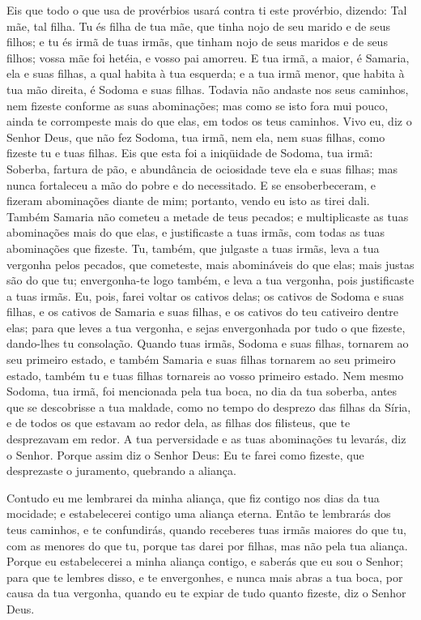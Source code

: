 Eis que todo o que usa de provérbios usará contra ti este
provérbio, dizendo: Tal mãe, tal filha. Tu és filha de tua
mãe, que tinha nojo de seu marido e de seus filhos; e tu és irmã de
tuas irmãs, que tinham nojo de seus maridos e de seus filhos; vossa
mãe foi hetéia, e vosso pai amorreu. E tua irmã, a maior, é
Samaria, ela e suas filhas, a qual habita à tua esquerda; e a tua
irmã menor, que habita à tua mão direita, é Sodoma e suas filhas.
Todavia não andaste nos seus caminhos, nem fizeste conforme
as suas abominações; mas como se isto fora mui pouco, ainda te
corrompeste mais do que elas, em todos os teus caminhos. Vivo
eu, diz o Senhor Deus, que não fez Sodoma, tua irmã, nem ela, nem
suas filhas, como fizeste tu e tuas filhas. Eis que esta foi
a iniqüidade de Sodoma, tua irmã: Soberba, fartura de pão, e
abundância de ociosidade teve ela e suas filhas; mas nunca
fortaleceu a mão do pobre e do necessitado. E se
ensoberbeceram, e fizeram abominações diante de mim; portanto, vendo
eu isto as tirei dali. Também Samaria não cometeu a metade de
teus pecados; e multiplicaste as tuas abominações mais do que elas,
e justificaste a tuas irmãs, com todas as tuas abominações que
fizeste. Tu, também, que julgaste a tuas irmãs, leva a tua
vergonha pelos pecados, que cometeste, mais abomináveis do que elas;
mais justas são do que tu; envergonha-te logo também, e leva a tua
vergonha, pois justificaste a tuas irmãs. Eu, pois, farei
voltar os cativos delas; os cativos de Sodoma e suas filhas, e os
cativos de Samaria e suas filhas, e os cativos do teu cativeiro
dentre elas; para que leves a tua vergonha, e sejas
envergonhada por tudo o que fizeste, dando-lhes tu consolação.
Quando tuas irmãs, Sodoma e suas filhas, tornarem ao seu
primeiro estado, e também Samaria e suas filhas tornarem ao seu
primeiro estado, também tu e tuas filhas tornareis ao vosso primeiro
estado. Nem mesmo Sodoma, tua irmã, foi mencionada pela tua
boca, no dia da tua soberba, antes que se descobrisse a tua
maldade, como no tempo do desprezo das filhas da Síria, e de todos
os que estavam ao redor dela, as filhas dos filisteus, que te
desprezavam em redor. A tua perversidade e as tuas
abominações tu levarás, diz o Senhor. Porque assim diz o
Senhor Deus: Eu te farei como fizeste, que desprezaste o juramento,
quebrando a aliança.

Contudo eu me lembrarei da minha aliança, que fiz contigo nos
dias da tua mocidade; e estabelecerei contigo uma aliança eterna.
Então te lembrarás dos teus caminhos, e te confundirás,
quando receberes tuas irmãs maiores do que tu, com as menores do que
tu, porque tas darei por filhas, mas não pela tua aliança.
Porque eu estabelecerei a minha aliança contigo, e saberás
que eu sou o Senhor; para que te lembres disso, e te
envergonhes, e nunca mais abras a tua boca, por causa da tua
vergonha, quando eu te expiar de tudo quanto fizeste, diz o Senhor
Deus.

